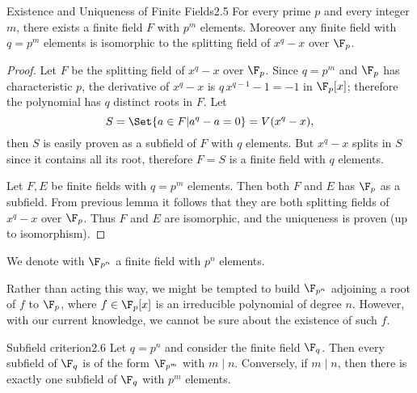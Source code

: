 \begin{teor}{Existence and Uniqueness of Finite Fields}{2.5}
	For every prime \(p\) and every integer \(m\), there exists a finite field \(F\) with \(p^m\) elements.
	Moreover any finite field with \(q=p^m\) elements is isomorphic to the splitting field of \(x^q-x\) over \(\F_p\).
\end{teor}

\begin{proof}
	Let \(F\) be the splitting field of \(x^q-x\) over \(\F_p\). Since \(q=p^m\) and \(\F_p\) has characteristic \(p\), the derivative of \(x^q-x\) is \(q\,x^{q-1}-1 = -1\) in \(\F_p[x]\); therefore the polynomial has \(q\) distinct roots in \(F\).
	Let
	\[
		S = \Set{a \in F | a^q-a = 0} = V(x^q-x),
	\]
	then \(S\) is easily proven as a subfield of \(F\) with \(q\) elements.
	But \(x^q-x\) splits in \(S\) since it contains all its root, therefore \(F=S\) is a finite field with \(q\) elements.
	
	Let \(F,E\) be finite fields with \(q=p^m\) elements. Then both \(F\) and \(E\) has \(\F_p\) as a subfield. From previous lemma it follows that they are both splitting fields of \(x^q-x\) over \(\F_p\). Thus \(F\) and \(E\) are isomorphic, and the uniqueness is proven (up to isomorphism).
\end{proof}

\begin{notz}
	We denote with \(\F_{p^n}\) a finite field with \(p^n\) elements.
\end{notz}

\begin{oss}
	Rather than acting this way, we might be tempted to build \(\F_{p^n}\) adjoining a root of \(f\) to \(\F_p\), where \(f \in \F_p[x]\) is an irreducible polynomial of degree \(n\).
	However, with our current knowledge, we cannot be sure about the existence of such \(f\).
\end{oss}

\begin{teor}{Subfield criterion}{2.6}
	Let \(q=p^n\) and consider the finite field \(\F_q\).
	Then every subfield of \(\F_q\) is of the form \(\F_{p^m}\) with \(m \mid n\).
	Conversely, if \(m \mid n\), then there is exactly one subfield of \(\F_q\) with \(p^m\) elements.
\end{teor}

